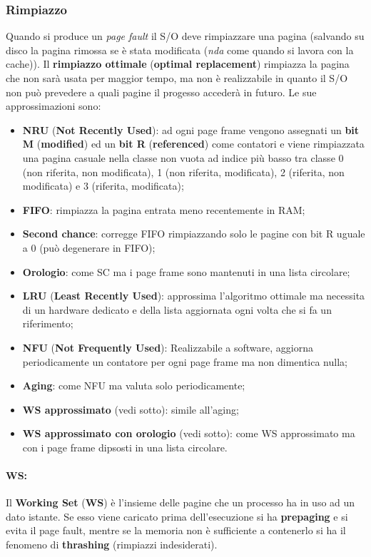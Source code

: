 \documentclass{article}
\begin{document}
\subsubsection{Rimpiazzo} Quando si produce un \textit{page fault} il S/O deve rimpiazzare una pagina (salvando su disco la pagina rimossa se è stata modificata (\textit{nda} come quando si lavora con la cache)). Il \textbf{rimpiazzo ottimale} (\textbf{optimal replacement}) rimpiazza la pagina che non sarà usata per maggior tempo, ma non è realizzabile in quanto il S/O non può prevedere a quali pagine il progesso accederà in futuro. Le sue approssimazioni sono:
\begin{itemize}
\item \textbf{NRU} (\textbf{Not Recently Used}): ad ogni page frame vengono assegnati un \textbf{bit M} (\textbf{modified}) ed un \textbf{bit R} (\textbf{referenced}) come contatori e viene rimpiazzata una pagina casuale nella classe non vuota ad indice più basso tra classe 0 (non riferita, non modificata), 1 (non riferita, modificata), 2 (riferita, non modificata) e 3 (riferita, modificata);
\item \textbf{FIFO}: rimpiazza la pagina entrata meno recentemente in RAM;
\item \textbf{Second chance}: corregge FIFO rimpiazzando solo le pagine con bit R uguale a $0$ (può degenerare in FIFO);
\item \textbf{Orologio}: come SC ma i page frame sono mantenuti in una lista circolare;
\item \textbf{LRU} (\textbf{Least Recently Used}): approssima l'algoritmo ottimale ma necessita di un hardware dedicato e della lista aggiornata ogni volta che si fa un riferimento;
\item \textbf{NFU} (\textbf{Not Frequently Used}): Realizzabile a software, aggiorna periodicamente un contatore per ogni page frame ma non dimentica nulla;
\item \textbf{Aging}: come NFU ma valuta solo periodicamente;
\item \textbf{WS approssimato} (vedi sotto): simile all'aging;
\item \textbf{WS approssimato con orologio} (vedi sotto): come WS approssimato ma con i page frame dipsosti in una lista circolare.
\end{itemize}

\paragraph{WS:} Il \textbf{Working Set} (\textbf{WS}) è l'insieme delle pagine che un processo ha in uso ad un dato istante. Se esso viene caricato prima dell'esecuzione si ha \textbf{prepaging} e si evita il page fault, mentre se la memoria non è sufficiente a contenerlo si ha il fenomeno di \textbf{thrashing} (rimpiazzi indesiderati).
\end{document}
